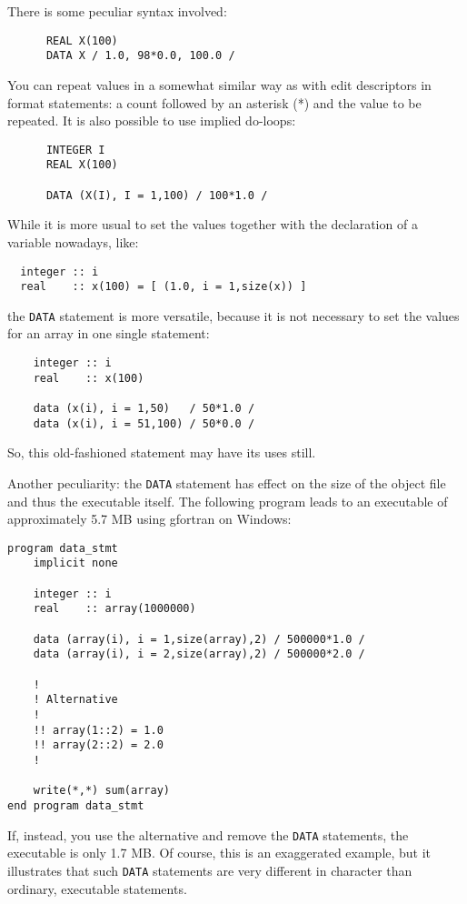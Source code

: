 There is some peculiar syntax involved:
%
\begin{verbatim}
      REAL X(100)
      DATA X / 1.0, 98*0.0, 100.0 /
\end{verbatim}

You can repeat values in a somewhat similar way as with edit descriptors
in format statements: a count followed by an asterisk (*) and the value
to be repeated. It is also possible to use implied do-loops:
%
\begin{verbatim}
      INTEGER I
      REAL X(100)

      DATA (X(I), I = 1,100) / 100*1.0 /
\end{verbatim}

While it is more usual to set the values together with the declaration
of a variable nowadays, like:
%
\begin{verbatim}
  integer :: i
  real    :: x(100) = [ (1.0, i = 1,size(x)) ]
\end{verbatim}
\noindent the \verb+DATA+ statement is more versatile, because it is
not necessary to set the values for an array in one single statement:
%
\begin{verbatim}
    integer :: i
    real    :: x(100)

    data (x(i), i = 1,50)   / 50*1.0 /
    data (x(i), i = 51,100) / 50*0.0 /
\end{verbatim}

So, this old-fashioned statement may have its uses still.

Another peculiarity: the \verb+DATA+ statement has effect on the
size of the object file and thus the executable itself. The following
program leads to an executable of approximately 5.7 MB using gfortran
on Windows:
\begin{verbatim}
program data_stmt
    implicit none

    integer :: i
    real    :: array(1000000)

    data (array(i), i = 1,size(array),2) / 500000*1.0 /
    data (array(i), i = 2,size(array),2) / 500000*2.0 /

    !
    ! Alternative
    !
    !! array(1::2) = 1.0
    !! array(2::2) = 2.0
    !

    write(*,*) sum(array)
end program data_stmt
\end{verbatim}

If, instead, you use the alternative and remove the \verb+DATA+
statements, the executable is only 1.7 MB. Of course, this is
an exaggerated example, but it illustrates that such \verb+DATA+
statements are very different in character than ordinary, executable
statements.



